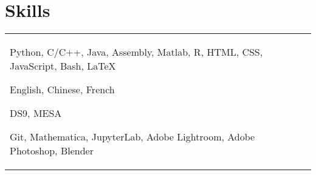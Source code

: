 \documentclass[10pt]{article} %
\begin{document}
\section{Skills} 






\begin{tabular}{L{4cm}@{\hskip 0.3in}L{13cm}} %

	
	
	
	{Python, C/C++, Java, Assembly, Matlab, R, HTML, CSS, JavaScript, Bash, \LaTeX} %
	{} %
	{} %
	{}
 {}
	
	{English, Chinese, French} %
	{} %
	{} %
	{} %
	{}
	
	{DS9, MESA} %
	{} %
	{} %
	{} %
	{}
	
	
	{Git, Mathematica, JupyterLab, Adobe Lightroom, Adobe Photoshop, Blender} %
	{} %
	{} %
	{} %
	{}
\end{tabular}
\end{document}
